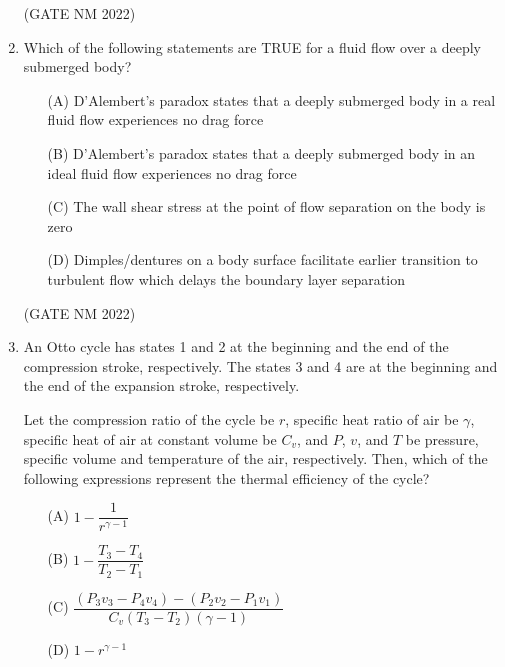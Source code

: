 \documentclass[journal,12pt,onecolumn]{IEEEtran}
\theoremstyle{remark}
\begin{document}
\begin{enumerate}
\hfill(GATE NM 2022)



\item  Which of the following statements are TRUE for a fluid flow over a deeply submerged body?

\begin{enumerate}
    \item[(A)] D'Alembert's paradox states that a deeply submerged body in a real fluid flow experiences no drag force
    \item[(B)] D'Alembert's paradox states that a deeply submerged body in an ideal fluid flow experiences no drag force
    \item[(C)] The wall shear stress at the point of flow separation on the body is zero
    \item[(D)] Dimples/dentures on a body surface facilitate earlier transition to turbulent flow which delays the boundary layer separation
\end{enumerate}

\hfill(GATE NM 2022)










\item  An Otto cycle has states 1 and 2 at the beginning and the end of the compression stroke, respectively.  
The states 3 and 4 are at the beginning and the end of the expansion stroke, respectively.  

Let the compression ratio of the cycle be $r$, specific heat ratio of air be $\gamma$, specific heat of air at constant volume be $C_v$, and $P$, $v$, and $T$ be pressure, specific volume and temperature of the air, respectively.  
Then, which of the following expressions represent the thermal efficiency of the cycle?

\begin{multicols}{2}

\begin{enumerate}
    \item[(A)] $1 - \dfrac{1}{r^{\gamma - 1}}$
    \item[(B)] $1 - \dfrac{T_3 - T_4}{T_2 - T_1}$
    \item[(C)] $\dfrac{(P_3 v_3 - P_4 v_4) - (P_2 v_2 - P_1 v_1)}{C_v(T_3 - T_2)(\gamma - 1)}$
    \item[(D)] $1 - r^{\gamma - 1}$
\end{enumerate}

\end{multicols}


\end{enumerate}
\end{document}
